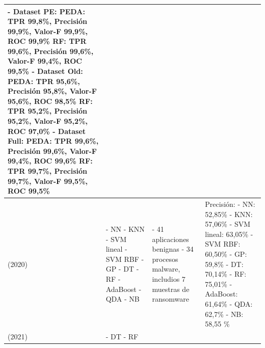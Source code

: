 {\begin{longtable}{|p{}|p{}|p{}|p{}|}
    - Dataset PE: \newline \gls{PEDA}: \gls{TPR} 99,8\%, Precisión 99,9\%, Valor-F 99,9\%, \gls{ROC} 99,9\% \newline \gls{RF}: \gls{TPR} 99,6\%, Precisión 99,6\%, Valor-F 99,4\%, \gls{ROC} 99,5\% \newline - Dataset Old: \newline \gls{PEDA}: \gls{TPR} 95,6\%, Precisión 95,8\%, Valor-F 95,6\%, \gls{ROC} 98,5\% \newline \gls{RF}: \gls{TPR} 95,2\%, Precisión 95,2\%, Valor-F 95,2\%, \gls{ROC} 97,0\% \newline - Dataset Full: \newline \gls{PEDA}: \gls{TPR} 99,6\%, Precisión 99,6\%, Valor-F 99,4\%, \gls{ROC} 99,6\% \newline \gls{RF}: \gls{TPR} 99,7\%, Precisión 99,7\%, Valor-F 99,5\%, \gls{ROC} 99,5\% \\ \hline
\cite{ARABO2020289} (2020) & 
- \gls{NN} \newline
- \gls{KNN} \newline
- \gls{SVM} lineal\newline
- \gls{SVM} \gls{RBF} \newline 
- \gls{GP} \newline
- \gls{DT} \newline
- \gls{RF} \newline
- AdaBoost \newline
- \gls{QDA} \newline
- \gls{NB} &
- 41 aplicaciones benignas \newline
- 34 procesos malware, includios 7 muestras de ransomware &
Precisión: \newline
- \gls{NN}: 52,85\% \newline
- \gls{KNN}: 57,06\% \newline
- \gls{SVM} lineal: 63,05\% \newline
- \gls{SVM} \gls{RBF}: 60,50\%\newline 
- \gls{GP}: 59,8\% \newline
- \gls{DT}: 70,14\% \newline
- \gls{RF}: 75,01\% \newline
- AdaBoost: 61,64\% \newline
- \gls{QDA}: 62,7\% \newline
- \gls{NB}: 58,55 \%  \\ \hline
\cite{Aurangzeb2021} (2021) &
- \gls{DT} \newline
- \gls{RF} \newline

\end{longtable}}
